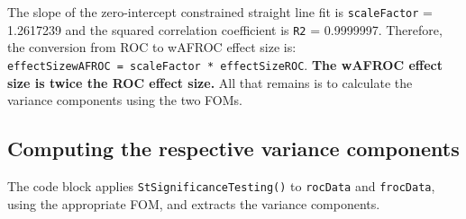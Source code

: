 \documentclass[
]{book}
\newenvironment{Shaded}{\begin{snugshade}}{\end{snugshade}}
\newcommand{\CommentTok}[1]{\textcolor[rgb]{0.56,0.35,0.01}{\textit{#1}}}
\newcommand{\DataTypeTok}[1]{\textcolor[rgb]{0.13,0.29,0.53}{#1}}
\newcommand{\DecValTok}[1]{\textcolor[rgb]{0.00,0.00,0.81}{#1}}
\newcommand{\FloatTok}[1]{\textcolor[rgb]{0.00,0.00,0.81}{#1}}
\newcommand{\KeywordTok}[1]{\textcolor[rgb]{0.13,0.29,0.53}{\textbf{#1}}}
\newcommand{\NormalTok}[1]{#1}
\newcommand{\OperatorTok}[1]{\textcolor[rgb]{0.81,0.36,0.00}{\textbf{#1}}}
\newcommand{\StringTok}[1]{\textcolor[rgb]{0.31,0.60,0.02}{#1}}
\begin{document}
\begin{Shaded}
\end{Shaded}

The slope of the zero-intercept constrained straight line fit is \texttt{scaleFactor} = 1.2617239 and the squared correlation coefficient is \texttt{R2} = 0.9999997. Therefore, the conversion from ROC to wAFROC effect size is: \texttt{effectSizewAFROC\ =\ scaleFactor\ *\ effectSizeROC}. \textbf{The wAFROC effect size is twice the ROC effect size.} All that remains is to calculate the variance components using the two FOMs.

\hypertarget{computing-the-respective-variance-components}{%
\subsection{Computing the respective variance components}\label{computing-the-respective-variance-components}}

The code block applies \texttt{StSignificanceTesting()} to \texttt{rocData} and \texttt{frocData}, using the appropriate FOM, and extracts the variance components.

\begin{Shaded}
\end{Shaded}
\end{document}
